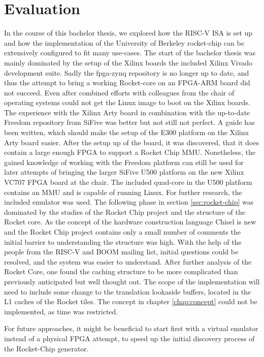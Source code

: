 \chapter{Evaluation}\label{chap:evaluation}
In the course of this bachelor thesis, we explored how the
RISC-V ISA is set up and how the implementation of the
University of Berkeley rocket-chip can be extensively
configured to fit many use-cases.
The start of the bachelor thesis was mainly dominated
by the setup of the Xilinx boards the included Xilinx Vivado
development suite.
Sadly the fpga-zynq repository is no longer up to date, and thus
the attempt to bring a working Rocket-core on an FPGA-ARM board did
not succeed. Even after combined efforts with colleagues from the
chair of operating systems could not get the Linux image to boot
on the Xilinx boards.
The experience with the Xilinx Arty board in combination
with the up-to-date Freedom repository from SiFive was better but
not still not perfect. A guide has been written, which should make
the setup of the E300 platform on the Xilinx Arty board easier.
After the setup up of the board, it was discovered, that it does contain
a large enough FPGA to support a Rocket Chip MMU.
Nonetheless, the gained knowledge of working with the Freedom
platform can still be used for later attempts of bringing
the larger SiFive U500 platform on the new Xilinx VC707 FPGA board
at the chair. The included quad-core in the U500 platform
contains an MMU and is capable of running Linux.
For further research, the included emulator was used.
The following phase in
section \ref{sec:rocket-chip} was dominated by the studies of
the Rocket Chip project and the structure of the Rocket core.
As the concept of the hardware construction language Chisel
is new and the Rocket Chip project contains only a small number
of comments the initial barrier to understanding the structure was high.
With the help of the people from the RISC-V and BOOM mailing list,
initial questions could be resolved, and the system was easier to understand.
After further analysis of the Rocket Core, one found the
caching structure to be more complicated than previously
anticipated but well thought out.
The scope of the implementation will need to include some
change to the translation lookaside buffers, located in the
L1 caches of the Rocket tiles.
The concept in chapter \ref{chap:concept} could not be
implemented, as time was restricted.

For future approaches, it might be beneficial to start first
with a virtual emulator instead of a physical FPGA attempt,
to speed up the initial discovery process of the Rocket-Chip
generator.